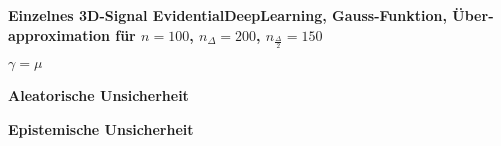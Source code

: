 \begin{otherlanguage}{ngerman}






\begin{samepage}
\begin{minipage}{\textwidth}

\noindent\textbf{Einzelnes 3D-Signal \gls{EvidentialDeepLearning}, Gauss-Funktion,
Überapproximation für $n=100$, $n_{\Delta}=200$, $n_{\frac{\Delta}{2}}=150$}


\begin{minipage}{0.05\textwidth}\vspace{0.5cm}\end{minipage}%
\begin{minipage}{0.3\textwidth}\centering \textbf{$\gamma=\mu$}\end{minipage}%
\begin{minipage}{0.3\textwidth}\centering \textbf{Aleatorische Unsicherheit}\end{minipage}%
\begin{minipage}{0.3\textwidth}\centering \textbf{Epistemische Unsicherheit}\end{minipage}


\end{minipage}
\end{samepage}
\end{otherlanguage}
